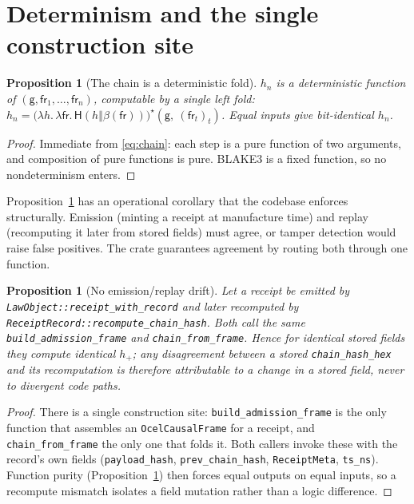 \documentclass[11pt,oneside]{book}
\theoremstyle{definition}
\theoremstyle{plain}
\newtheorem{proposition}[theorem]{Proposition}
\theoremstyle{remark}
\newcommand{\chainH}{\mathsf{H}}               %
\newcommand{\fr}{\mathsf{fr}}                   %
\newcommand{\body}{\beta}                       %
\newcommand{\code}[1]{\texttt{#1}}
\newcommand{\concat}{\mathbin{\Vert}}           %
\newcommand{\Genesis}{\mathsf{g}}               %
\begin{document}
\section{Determinism and the single construction site}

\begin{proposition}[The chain is a deterministic fold]\label{prop:fold}
$h_n$ is a deterministic function of $(\Genesis,\fr_1,\dots,\fr_n)$, computable by a single left fold: $h_n=\bigl(\lambda h.\,\lambda \fr.\,\chainH(h\concat\body(\fr))\bigr)^{\!\star} (\Genesis,\ (\fr_t)_t)$. %
Equal inputs give bit-identical $h_n$. %
\end{proposition}

\begin{proof}
Immediate from \eqref{eq:chain}: each step is a pure function of two arguments, and composition of pure functions is pure. %
BLAKE3 is a fixed function, so no nondeterminism enters. %
\end{proof} %

Proposition~\ref{prop:fold} has an operational corollary that the codebase enforces structurally. %
Emission (minting a receipt at manufacture time) and replay (recomputing it later from stored fields) must agree, or tamper detection would raise false positives. %
The crate guarantees agreement by routing both through one function. %

\begin{proposition}[No emission/replay drift]\label{prop:nodrift}
Let a receipt be emitted by \code{LawObject::receipt\_with\_record} and later recomputed by \code{ReceiptRecord::recompute\_chain\_hash}. %
Both call the same \code{build\_admission\_frame} and \code{chain\_from\_frame}. %
Hence for identical stored fields they compute identical $h_{+}$; any disagreement between a stored \code{chain\_hash\_hex} and its recomputation is therefore attributable to a change in a stored field, never to divergent code paths. %
\end{proposition}

\begin{proof}
There is a single construction site: \code{build\_admission\_frame} is the only function that assembles an \code{OcelCausalFrame} for a receipt, and \code{chain\_from\_frame} the only one that folds it. %
Both callers invoke these with the record's own fields (\code{payload\_hash}, \code{prev\_chain\_hash}, \code{ReceiptMeta}, \code{ts\_ns}). %
Function purity (Proposition~\ref{prop:fold}) then forces equal outputs on equal inputs, so a recompute mismatch isolates a field mutation rather than a logic difference. %
\end{proof} %
\end{document}
